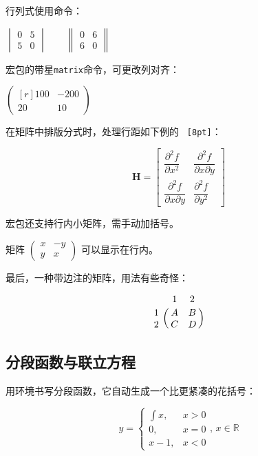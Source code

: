 行列式使用命令：
\begin{codeshow}
\centering $\begin{vmatrix}
0 & 5 \\ 5 & 0 \end{vmatrix}\qquad
\begin{Vmatrix} 0 & 6 \\
6 & 0 \end{Vmatrix}$
\end{codeshow}

宏包的带星\texttt{matrix}命令，可更改列对齐：
\begin{codeshow}
$\begin{pmatrix*}[r]
100 & -200 \\ 20 & 10
\end{pmatrix*}$
\end{codeshow}

在矩阵中排版分式时，处理行距如下例的 \texttt{ [8pt]}：
\begin{codeshow}
\[\mathbf{H}=\begin{bmatrix}
\dfrac{\partial^2 f}{\partial x^2} &
\dfrac{\partial^2 f}
{\partial x \partial y} \\[8pt]
\dfrac{\partial^2 f}
{\partial x \partial y} &
\dfrac{\partial^2 f}{\partial y^2}
\end{bmatrix}\]
\end{codeshow}

宏包还支持行内小矩阵，需手动加括号。
\begin{codeshow}
矩阵 $\left(\begin{smallmatrix}
x & -y\\ y & x\end{smallmatrix}
\right)$ 可以显示在行内。
\end{codeshow}

最后，一种带边注的矩阵，用法有些奇怪：
\begin{codeshow}
\[\bordermatrix{& 1 & 2\cr
1 & A & B \cr
2 & C & D \cr} \]
\end{codeshow}

\subsection{分段函数与联立方程}
用环境书写分段函数，它自动生成一个比更紧凑的花括号：

\begin{codeshow}
\[y=\begin{cases}
\int x, & x>0 \\
0,   & x=0 \\
x-1, & x<0
\end{cases},\,x\in\mathbb{R}\]
\end{codeshow}

